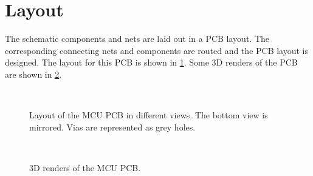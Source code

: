 \section{Layout}
The schematic components and nets are laid out in a PCB layout. The corresponding connecting nets and components are routed and the PCB layout is designed. The layout for this PCB is shown in \cref{fig:lay_mcu}. Some 3D renders of the PCB are shown in \cref{fig:lay_mcu_3d}.

\begin{figure}[h]
	\centering
	\\
	\caption{Layout of the MCU PCB in different views. The bottom view is mirrored. Vias are represented as grey holes.}
	\label{fig:lay_mcu}
\end{figure}

\begin{figure}[h]
	\centering
	\\
	\caption{3D renders of the MCU PCB.}
	\label{fig:lay_mcu_3d}
\end{figure}
